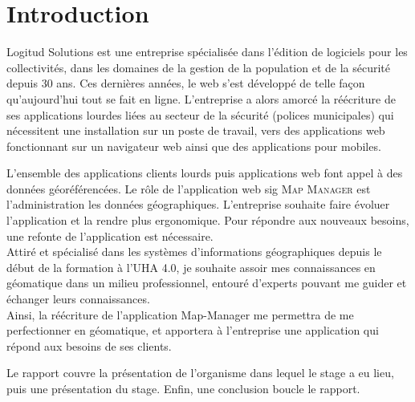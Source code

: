 \documentclass{rapportUHA40}
\begin{document}

\renewcommand{\baselinestretch}{0.9}\normalsize
\tabledematieres%
\renewcommand{\baselinestretch}{1.0}\normalsize

\setcounter{figure}{0}%


\section{Introduction}
Logitud Solutions est une entreprise spécialisée dans l'édition de logiciels
pour les collectivités, dans les domaines de la gestion de la population et de
la sécurité depuis 30 ans. Ces dernières années, le web s'est développé de
telle façon qu'aujourd'hui tout se fait en ligne. L'entreprise a alors amorcé
la réécriture de ses applications lourdes liées au secteur de la sécurité
(polices municipales) qui nécessitent une installation sur un poste de travail,
vers des applications web fonctionnant sur un navigateur web ainsi que des
applications pour mobiles.

L'ensemble des applications clients lourds puis applications web font appel à
des données géoréférencées. Le rôle de l'application web \gls{sig} \textsc{Map
  Manager} est l'administration les données géographiques. L'entreprise souhaite
faire évoluer l'application et la rendre plus ergonomique. Pour répondre aux
nouveaux besoins, une refonte de l'application est nécessaire. \\

Attiré et spécialisé dans les systèmes d'informations géographiques depuis le
début de la formation à l'UHA 4.0, je souhaite assoir mes connaissances en
géomatique dans un milieu professionnel, entouré d'experts pouvant me guider et
échanger leurs connaissances. \\

Ainsi, la réécriture de l'application Map-Manager me permettra de me
perfectionner en géomatique, et apportera à l'entreprise une application qui
répond aux besoins de ses clients.

\vspace{2cm}

Le rapport couvre la présentation de l'organisme dans lequel le stage a eu
lieu, puis une présentation du stage. Enfin, une conclusion boucle le rapport.
\end{document}
